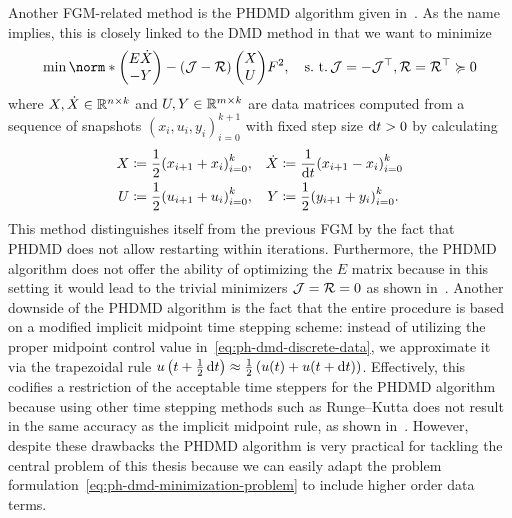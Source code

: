 Another \ac{FGM}-related method is the \ac{PHDMD} algorithm given in~\cite{Morandin2023}.
As the name implies, this is closely linked to the \ac{DMD} method in that we want to minimize
\begin{equation}\label{eq:ph-dmd-minimization-problem}
    \min \norm*{\begin{pmatrix}
        E \dot{X} \\
        -Y
    \end{pmatrix} - (\mcl{J} - \mcl{R}) \begin{pmatrix}
        X \\
        U
    \end{pmatrix}}{F}^2,\quad \suchthat \mcl{J} = - \mcl{J}\trans, \mcl{R} = \mcl{R}\trans \succcurlyeq 0
\end{equation}
where $X, \dot{X} \in \mathbb{R}^{n \times k}$ and $U, Y \in \mathbb{R}^{m \times k}$ are data matrices computed from a sequence of snapshots ${(x_i, u_i, y_i)}_{i = 0}^{k + 1}$ with fixed step size $\mathop{}\!\mathrm{d} t > 0$ by calculating
\begin{equation}\label{eq:ph-dmd-discrete-data}
    \begin{alignedat}{3}
        X &\coloneqq \frac{1}{2} {\left( x_{i + 1} + x_i \right)}_{i = 0}^k,\quad &\dot{X} &\coloneqq \frac{1}{\mathop{}\!\mathrm{d} t} {\left( x_{i + 1} - x_i \right)}_{i = 0}^k \\
        U &\coloneqq \frac{1}{2} {\left( u_{i + 1} + u_i \right)}_{i = 0}^k,\quad &Y &\coloneqq \frac{1}{2} {\left( y_{i + 1} + y_i \right)}_{i = 0}^k.
    \end{alignedat}
\end{equation}
This method distinguishes itself from the previous \ac{FGM} by the fact that \ac{PHDMD} does not allow restarting within iterations.
Furthermore, the \ac{PHDMD} algorithm does not offer the ability of optimizing the $E$ matrix because in this setting it would lead to the trivial minimizers $\mathcal{J} = \mathcal{R} = 0$ as shown in~\cite[Remark~3.3]{Morandin2023}.
Another downside of the \ac{PHDMD} algorithm is the fact that the entire procedure is based on a modified implicit midpoint time stepping scheme: instead of utilizing the proper midpoint control value in~\eqref{eq:ph-dmd-discrete-data}, we approximate it via the trapezoidal rule $u\left( t + \frac{1}{2} \mathop{}\!\mathrm{d} t \right) \approx \frac{1}{2} \left( u(t) + u(t + \mathop{}\!\mathrm{d} t) \right)$.
Effectively, this codifies a restriction of the acceptable time steppers for the \ac{PHDMD} algorithm because using other time stepping methods such as Runge--Kutta does not result in the same accuracy as the implicit midpoint rule, as shown in~\cite[Section~4.1]{Morandin2023}.
However, despite these drawbacks the \ac{PHDMD} algorithm is very practical for tackling the central problem of this thesis because we can easily adapt the problem formulation~\eqref{eq:ph-dmd-minimization-problem} to include higher order data terms.

